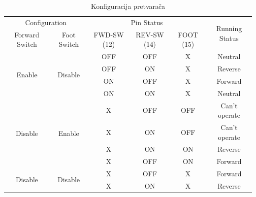 \begin{table}[]
\centering
\begin{tabular}{|c|c|c|c|c|c|}
\hline
\multicolumn{2}{|c|}{Configuration} & \multicolumn{3}{c|}{Pin Status} & \multirow{2}{*}{Running Status} \\ \cline{1-5}
Forward Switch & Foot Switch & FWD-SW (12) & REV-SW (14) & FOOT (15) &  \\ \hline
\multirow{4}{*}{Enable} & \multirow{4}{*}{Disable} & OFF & OFF & X & Neutral \\ \cline{3-6} 
 &  & OFF & ON & X & Reverse \\ \cline{3-6} 
 &  & ON & OFF & X & Forward \\ \cline{3-6} 
 &  & ON & ON & X & Neutral \\ \hline
\multirow{4}{*}{Disable} & \multirow{4}{*}{Enable} & X & OFF & OFF & Can't operate \\ \cline{3-6} 
 &  & X & ON & OFF & Can't operate \\ \cline{3-6} 
 &  & X & ON & ON & Reverse \\ \cline{3-6} 
 &  & X & OFF & ON & Forward \\ \hline
\multirow{2}{*}{Disable} & \multirow{2}{*}{Disable} & X & OFF & X & Forward \\ \cline{3-6} 
 &  & X & ON & X & Reverse \\ \hline
\end{tabular}
\caption{Konfiguracija pretvarača}
\label{tab:konfiguracija}
\end{table}

